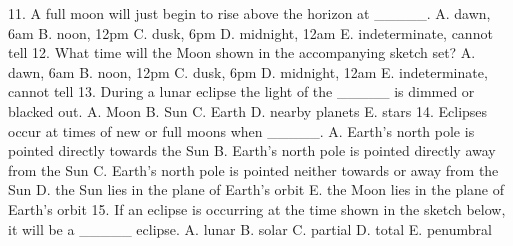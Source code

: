 11. A full moon will just begin to rise above the horizon at _____.
A. dawn, 6am
B. noon, 12pm
C. dusk, 6pm
D. midnight, 12am
E. indeterminate, cannot tell
12. What time will the Moon shown in the
accompanying sketch set?
A. dawn, 6am
B. noon, 12pm
C. dusk, 6pm
D. midnight, 12am
E. indeterminate, cannot tell
13. During a lunar eclipse the light of the _____ is dimmed or blacked out.
A. Moon
B. Sun
C. Earth
D. nearby planets
E. stars
14. Eclipses occur at times of new or full moons when _____.
A. Earth’s north pole is pointed directly towards the Sun
B. Earth’s north pole is pointed directly away from the Sun
C. Earth’s north pole is pointed neither towards or away from the Sun
D. the Sun lies in the plane of Earth’s orbit
E. the Moon lies in the plane of Earth’s orbit
15. If an eclipse is occurring at the time shown
in the sketch below, it will be a _____
eclipse.
A. lunar
B. solar
C. partial
D. total
E. penumbral






\endinput




